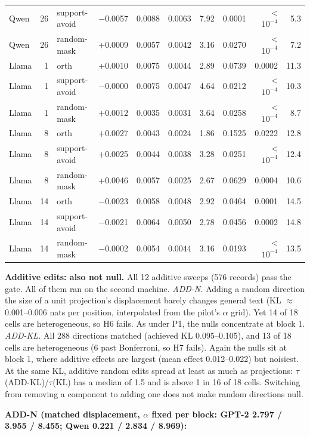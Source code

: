 \documentclass[
  10pt,
]{article}
\begin{document}
{\begin{longtable}[]{@{}lrlrrrrrrr@{}}
Qwen & 26 & support-avoid & $-$0.0057 & 0.0088 & 0.0063 & 7.92 & 0.0001 &
\textless{} $10^{-4}$ & 5.3 \\
Qwen & 26 & random-mask & +0.0009 & 0.0057 & 0.0042 & 3.16 & 0.0270 &
\textless{} $10^{-4}$ & 7.2 \\
Llama & 1 & orth & +0.0010 & 0.0075 & 0.0044 & 2.89 & 0.0739 & 0.0002 &
11.3 \\
Llama & 1 & support-avoid & $-$0.0000 & 0.0075 & 0.0047 & 4.64 & 0.0212 &
\textless{} $10^{-4}$ & 10.3 \\
Llama & 1 & random-mask & +0.0012 & 0.0035 & 0.0031 & 3.64 & 0.0258 &
\textless{} $10^{-4}$ & 8.7 \\
Llama & 8 & orth & +0.0027 & 0.0043 & 0.0024 & 1.86 & 0.1525 & 0.0222 &
12.8 \\
Llama & 8 & support-avoid & +0.0025 & 0.0044 & 0.0038 & 3.28 & 0.0251 &
\textless{} $10^{-4}$ & 12.4 \\
Llama & 8 & random-mask & +0.0046 & 0.0057 & 0.0025 & 2.67 & 0.0629 &
0.0004 & 10.6 \\
Llama & 14 & orth & $-$0.0023 & 0.0058 & 0.0048 & 2.92 & 0.0464 & 0.0001 &
14.5 \\
Llama & 14 & support-avoid & $-$0.0021 & 0.0064 & 0.0050 & 2.78 & 0.0456 &
0.0002 & 14.8 \\
Llama & 14 & random-mask & $-$0.0002 & 0.0054 & 0.0044 & 3.16 & 0.0193 &
\textless{} $10^{-4}$ & 13.5 \\
\end{longtable}
}

\textbf{Additive edits: also not null.} All 12 additive sweeps (576
records) pass the gate. All of them ran on the second machine.
\emph{ADD-N.} Adding a random direction the size of a unit projection's
displacement barely changes general text (KL $\approx$ 0.001--0.006 nats per
position, interpolated from the pilot's $\alpha$ grid). Yet 14 of 18 cells are
heterogeneous, so H6 fails. As under P1, the nulls concentrate at block
1. \emph{ADD-KL.} All 288 directions matched (achieved KL 0.095--0.105),
and 13 of 18 cells are heterogeneous (6 past Bonferroni, so H7 fails).
Again the nulls sit at block 1, where additive effects are largest (mean
\textbar effect\textbar{} 0.012--0.022) but noisiest. At the same KL,
additive random edits spread at least as much as projections:
$\tau$(ADD-KL)/$\tau$(KL) has a median of 1.5 and is above 1 in 16 of 18 cells.
Switching from removing a component to adding one does not make random
directions null.

\textbf{ADD-N (matched displacement, $\alpha$ fixed per block: GPT-2 2.797 /
3.955 / 8.455; Qwen 0.221 / 2.834 / 8.969):}
\end{document}

